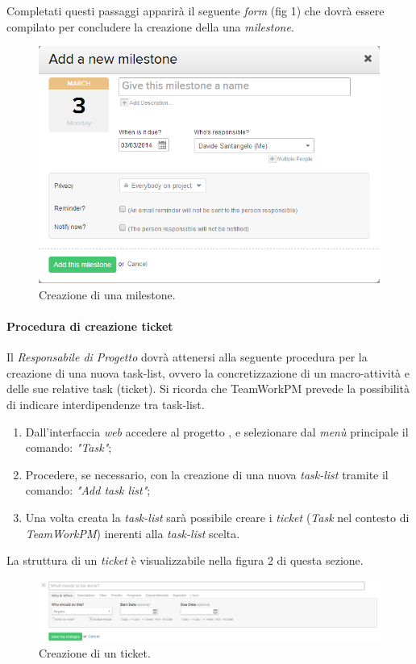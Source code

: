 Completati questi passaggi apparirà il seguente \textit{form} (fig 1) che dovrà essere compilato per concludere la creazione della una \textit{milestone}.
\begin{figure}
\centering
\includegraphics[width=%
\textwidth]{immaginiNDP/Immagine}
\caption[]{Creazione di una milestone.}
\label{fig:Immagine}
\end{figure}

\paragraph{Procedura di creazione ticket} 
Il \textit{Responsabile di Progetto} dovrà attenersi alla seguente procedura per la creazione di una nuova task-list, ovvero la concretizzazione di un macro-attività e delle sue relative task (ticket). Si ricorda che TeamWorkPM prevede la possibilità di indicare interdipendenze tra task-list.
\begin{enumerate}
\item Dall'interfaccia \textit{web} accedere al progetto \progetto{}, e selezionare dal \textit{menù} principale il comando: \emph{"Task"};
\item Procedere, se necessario, con la creazione di una nuova \textit{task-list} tramite il comando: \emph{"Add task list"};
\item Una volta creata la \textit{task-list} sarà possibile creare i \textit{ticket} (\textit{Task} nel contesto di \textit{TeamWorkPM}) inerenti alla \textit{task-list} scelta.
\end{enumerate}

La struttura di un \textit{ticket} è visualizzabile nella figura 2 di questa sezione.
\begin{figure}
\centering
\includegraphics[width=%
\linewidth]{immaginiNDP/creazionetask}
\caption[]{Creazione di un ticket.}
\label{fig:creazionetask}
\end{figure}

